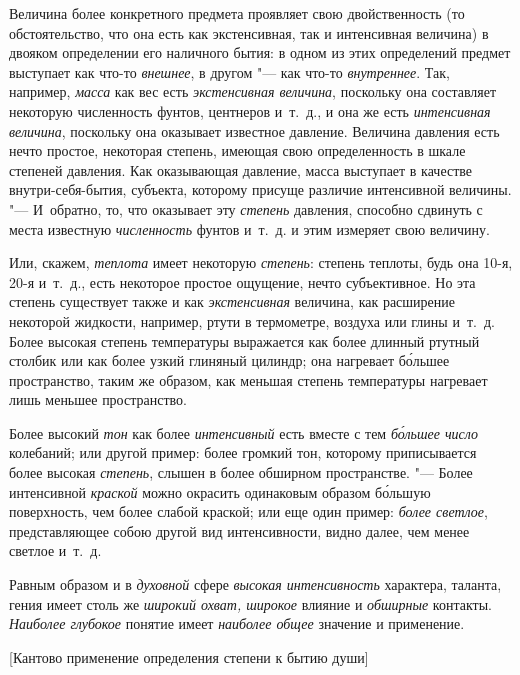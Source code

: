 Величина более конкретного предмета проявляет свою двойственность (то
обстоятельство, что она есть как экстенсивная, так и интенсивная величина)
в двояком определении его наличного бытия: в одном из этих определений
предмет выступает как что-то {\em внешнее}, в другом "--- как что-то
{\em внутреннее}. Так, например, {\em масса} как вес есть {\em экстенсивная
величина}, поскольку она составляет некоторую численность фунтов, центнеров
и~т.~д., и она же есть {\em интенсивная величина}, поскольку она оказывает
известное давление. Величина давления есть нечто простое, некоторая степень,
имеющая свою определенность в шкале степеней давления. Как оказывающая
давление, масса выступает в качестве внутри-себя-бытия, субъекта, которому
присуще различие интенсивной величины. "--- И~обратно, то, что оказывает эту
{\em степень} давления, способно сдвинуть с места известную {\em численность}
фунтов и~т.~д. и этим измеряет свою величину.

Или, скажем, {\em теплота} имеет некоторую {\em степень}: степень теплоты, будь
она 10-я, 20-я и~т.~д., есть некоторое простое ощущение, нечто субъективное. Но
эта степень существует также и как {\em экстенсивная} величина, как расширение
некоторой жидкости, например, ртути в термометре, воздуха или глины и~т.~д.
Более высокая степень температуры выражается как более длинный ртутный столбик
или как более узкий глиняный цилиндр; она нагревает б\'{о}льшее пространство,
таким же образом, как меньшая степень температуры нагревает лишь меньшее
пространство.

Более высокий {\em тон} как более {\em интенсивный} есть вместе с тем
{\em б\'{о}льшее число} колебаний; или другой пример: более громкий тон,
которому приписывается более высокая {\em степень}, слышен в более обширном
пространстве. "--- Более интенсивной {\em краской} можно окрасить одинаковым
образом б\'{о}льшую поверхность, чем более слабой краской; или еще один пример:
{\em более светлое}, представляющее собою другой вид интенсивности, видно
далее, чем менее светлое и~т.~д.

Равным образом и в {\em духовной} сфере {\em высокая интенсивность} характера,
таланта, гения имеет столь же {\em широкий охват, широкое}
влияние и {\em обширные} контакты.
{\em Наиболее глубокое} понятие имеет {\em наиболее общее}
значение и применение.

%
{[Кантово применение определения степени к бытию души]}

